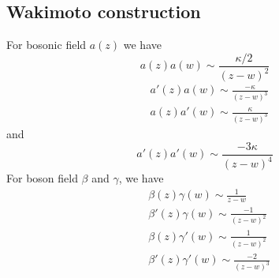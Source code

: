 \subsection{Wakimoto construction}
For bosonic field $a(z)$ we have
\begin{equation}
	a(z)a(w) \sim \frac{\kappa/2}{(z-w)^2}
\end{equation}
\begin{eqnarray}
&a'(z)a(w) \sim  \frac{- \kappa}{(z-w)^3}\\
&a(z)a'(w) \sim \frac{\kappa}{(z-w)^3}
\end{eqnarray}
and 
\begin{equation}
	a'(z)a'(w) \sim \frac{-3\kappa}{(z-w)^4}
\end{equation}
For boson field $\beta$ and $\gamma$, we have
\begin{eqnarray}
	& \beta(z) \gamma(w) \sim \frac{1}{z-w} \\
	& \beta'(z) \gamma(w) \sim \frac{-1}{(z-w)^2}\\
	& \beta(z) \gamma'(w) \sim \frac{1}{(z-w)^2} \\
	& \beta'(z) \gamma'(w) \sim \frac{-2}{(z-w)^3} 
\end{eqnarray}
